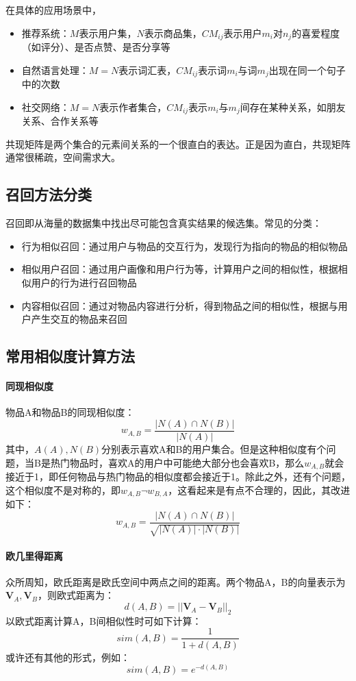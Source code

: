 在具体的应用场景中，
\begin{itemize}
	\item 推荐系统：$M$表示用户集，$N$表示商品集，$CM_{ij}$表示用户$m_i$对$n_j$的喜爱程度（如评分）、是否点赞、是否分享等
	\item 自然语言处理：$M = N$表示词汇表，$CM_{ij}$表示词$m_i$与词$m_j$出现在同一个句子中的次数
	\item 社交网络：$M=N$表示作者集合，$CM_{ij}$表示$m_i$与$m_j$间存在某种关系，如朋友关系、合作关系等
\end{itemize}
共现矩阵是两个集合的元素间关系的一个很直白的表达。正是因为直白，共现矩阵通常很稀疏，空间需求大。

\subsection{召回方法分类}
召回即从海量的数据集中找出尽可能包含真实结果的候选集。常见的分类：
\begin{itemize}
	\item 行为相似召回：通过用户与物品的交互行为，发现行为指向的物品的相似物品
	\item 相似用户召回：通过用户画像和用户行为等，计算用户之间的相似性，根据相似用户的行为进行召回物品
	\item 内容相似召回：通过对物品内容进行分析，得到物品之间的相似性，根据与用户产生交互的物品来召回
\end{itemize}


\subsection{常用相似度计算方法}
\paragraph{同现相似度}
物品A和物品B的同现相似度：
$$
w_{A,B} = \frac{|N(A) \cap N(B)|}{|N(A)|}
$$
其中，$A(A), N(B)$分别表示喜欢A和B的用户集合。但是这种相似度有个问题，当B是热门物品时，喜欢A的用户中可能绝大部分也会喜欢B，那么$w_{A,B}$就会接近于1，即任何物品与热门物品的相似度都会接近于1。除此之外，还有个问题，这个相似度不是对称的，即$w_{A,B} \neg w_{B,A}$，这看起来是有点不合理的，因此，其改进如下：
$$
w_{A,B} = \frac{|N(A) \cap N(B)|}{\sqrt{|N(A)| \cdot |N(B)|}}
$$

\paragraph{欧几里得距离}
众所周知，欧氏距离是欧氏空间中两点之间的距离。两个物品A，B的向量表示为$\boldsymbol{V}_A, \boldsymbol{V}_B$，则欧式距离为：
$$
d(A, B) = ||\boldsymbol{V}_A - \boldsymbol{V}_B||_2
$$
以欧式距离计算A，B间相似性时可如下计算：
$$
sim(A, B) = \frac{1}{1 + d(A, B)}
$$
或许还有其他的形式，例如：
$$
sim(A, B) = e^{-d(A, B)}
$$

